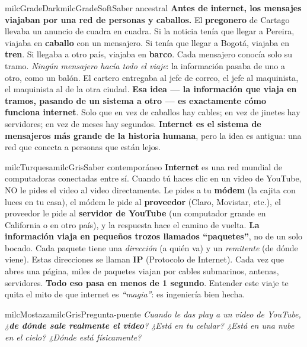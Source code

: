 \documentclass[11pt,letterpaper]{article}
\begin{document}
\begin{softbox}{milcGradeDark}{milcGradeSoft}{Saber ancestral}
\textbf{Antes de internet, los mensajes viajaban por una red de personas y caballos.} El \textbf{pregonero} de Cartago llevaba un anuncio de cuadra en cuadra. Si la noticia tenía que llegar a Pereira, viajaba en \textbf{caballo} con un mensajero. Si tenía que llegar a Bogotá, viajaba en \textbf{tren}. Si llegaba a otro país, viajaba en \textbf{barco}. Cada mensajero conocía solo su tramo. \emph{Ningún mensajero hacía todo el viaje}: la información pasaba de uno a otro, como un balón. El cartero entregaba al jefe de correo, el jefe al maquinista, el maquinista al de la otra ciudad. \textbf{Esa idea --- la información que viaja en tramos, pasando de un sistema a otro --- es exactamente cómo funciona internet}. Solo que en vez de caballos hay cables; en vez de jinetes hay servidores; en vez de meses hay segundos. \textbf{Internet es el sistema de mensajeros más grande de la historia humana}, pero la idea es antigua: una red que conecta a personas que están lejos.
\end{softbox}

\begin{softbox}{milcTurquesa}{milcGris}{Saber contemporáneo}
\textbf{Internet} es una red mundial de computadoras conectadas entre sí. Cuando tú haces clic en un video de YouTube, NO le pides el video al video directamente. Le pides a tu \textbf{módem} (la cajita con luces en tu casa), el módem le pide al \textbf{proveedor} (Claro, Movistar, etc.), el proveedor le pide al \textbf{servidor de YouTube} (un computador grande en California o en otro país), y la respuesta hace el camino de vuelta. \textbf{La información viaja en pequeños trozos llamados ``paquetes''}, no de un solo bocado. Cada paquete tiene una \emph{dirección} (a quién va) y un \emph{remitente} (de dónde viene). Estas direcciones se llaman \textbf{IP} (Protocolo de Internet). Cada vez que abres una página, miles de paquetes viajan por cables submarinos, antenas, servidores. \textbf{Todo eso pasa en menos de 1 segundo}. Entender este viaje te quita el mito de que internet es \emph{``magia''}: es ingeniería bien hecha.
\end{softbox}

\begin{softbox}{milcMostaza}{milcGris}{Pregunta-puente}
\textit{Cuando le das \emph{play} a un video de YouTube, ¿\textbf{de dónde sale realmente el video}? ¿Está en tu celular? ¿Está en una nube en el cielo? ¿Dónde está físicamente?}
\end{softbox}
\end{document}
